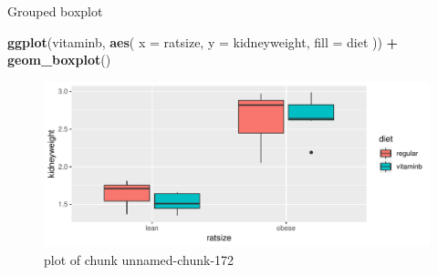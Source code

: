 \documentclass[ignorenonframetext,]{beamer}
\newenvironment{Shaded}{\begin{snugshade}}{\end{snugshade}}
\newcommand{\DataTypeTok}[1]{\textcolor[rgb]{0.13,0.29,0.53}{#1}}
\newcommand{\KeywordTok}[1]{\textcolor[rgb]{0.13,0.29,0.53}{\textbf{#1}}}
\newcommand{\NormalTok}[1]{#1}
\newcommand{\OperatorTok}[1]{\textcolor[rgb]{0.81,0.36,0.00}{\textbf{#1}}}
\newcommand{\StringTok}[1]{\textcolor[rgb]{0.31,0.60,0.02}{#1}}
\begin{document}
\begin{frame}[fragile]{Grouped boxplot}
\protect\hypertarget{grouped-boxplot}{}

\begin{Shaded}
\begin{Highlighting}[]
\KeywordTok{ggplot}\NormalTok{(vitaminb, }\KeywordTok{aes}\NormalTok{(}
  \DataTypeTok{x =}\NormalTok{ ratsize, }\DataTypeTok{y =}\NormalTok{ kidneyweight,}
  \DataTypeTok{fill =}\NormalTok{ diet}
\NormalTok{)) }\OperatorTok{+}\StringTok{ }\KeywordTok{geom_boxplot}\NormalTok{()}
\end{Highlighting}
\end{Shaded}

\begin{figure}
\centering
\includegraphics{figure/unnamed-chunk-172-1.pdf}
\caption{plot of chunk unnamed-chunk-172}
\end{figure}

\end{frame}
\end{document}
